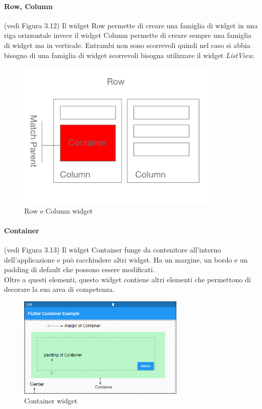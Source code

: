 \paragraph{Row, Column} (vedi Figura 3.12)
Il widget Row permette di creare una famiglia di widget in una riga orizzontale invece il widget Column permette di creare sempre una famiglia di widget ma in verticale.
Entrambi non sono scorrevoli quindi nel caso si abbia bisogno di una famiglia di widget scorrevoli bisogna utilizzare il widget \textit{ListView}.
\begin{figure}[htbp]	
	\centering
	\includegraphics[width=10cm]{immagini/rowcolumn.png}
	\caption{Row e Column widget}
	\label{fig:Row e Column widget}
\end{figure}

\newpage

\paragraph{Container} (vedi Figura 3.13)
Il widget Container funge da contenitore all'interno dell'applicazione e può racchiudere altri widget.
Ha un margine, un bordo e un padding di default che possono essere modificati.\\
Oltre a questi elementi, questo widget contiene altri elementi che permettono di decorare la sua area di competenza.
\begin{figure}[htbp]	
	\centering
	\includegraphics[width=8cm]{immagini/container.png}
	\caption{Container widget}
	\label{fig:Container widget}
\end{figure}

